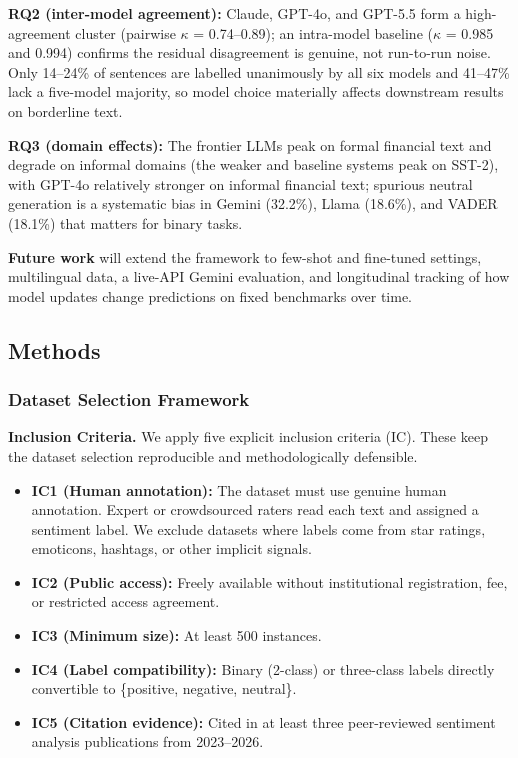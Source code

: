 \documentclass[11pt]{article}
\providecommand{\tightlist}{\setlength{\itemsep}{0pt}\setlength{\parskip}{0pt}}
\begin{document}
\textbf{RQ2 (inter-model agreement):} Claude, GPT-4o, and GPT-5.5 form a
high-agreement cluster (pairwise $\kappa$ = 0.74--0.89); an intra-model
baseline ($\kappa$ = 0.985 and 0.994) confirms the residual disagreement is
genuine, not run-to-run noise. Only 14--24\% of sentences are labelled
unanimously by all six models and 41--47\% lack a five-model majority,
so model choice materially affects downstream results on borderline
text.

\textbf{RQ3 (domain effects):} The frontier LLMs peak on formal
financial text and degrade on informal domains (the weaker and baseline
systems peak on SST-2), with GPT-4o relatively stronger on informal
financial text; spurious neutral generation is a systematic bias in
Gemini (32.2\%), Llama (18.6\%), and VADER (18.1\%) that matters for
binary tasks.

\textbf{Future work} will extend the framework to few-shot and
fine-tuned settings, multilingual data, a live-API Gemini evaluation,
and longitudinal tracking of how model updates change predictions on
fixed benchmarks over time.

\subsection{Methods}\label{methods}

\subsubsection{Dataset Selection
Framework}\label{dataset-selection-framework}

\textbf{Inclusion Criteria.} We apply five explicit inclusion criteria
(IC). These keep the dataset selection reproducible and methodologically
defensible.

\begin{itemize}
\tightlist
\item
  \textbf{IC1 (Human annotation):} The dataset must use genuine human
  annotation. Expert or crowdsourced raters read each text and assigned
  a sentiment label. We exclude datasets where labels come from star
  ratings, emoticons, hashtags, or other implicit signals.
\item
  \textbf{IC2 (Public access):} Freely available without institutional
  registration, fee, or restricted access agreement.
\item
  \textbf{IC3 (Minimum size):} At least 500 instances.
\item
  \textbf{IC4 (Label compatibility):} Binary (2-class) or three-class
  labels directly convertible to \{positive, negative, neutral\}.
\item
  \textbf{IC5 (Citation evidence):} Cited in at least three
  peer-reviewed sentiment analysis publications from 2023--2026.
\end{itemize}
\end{document}
